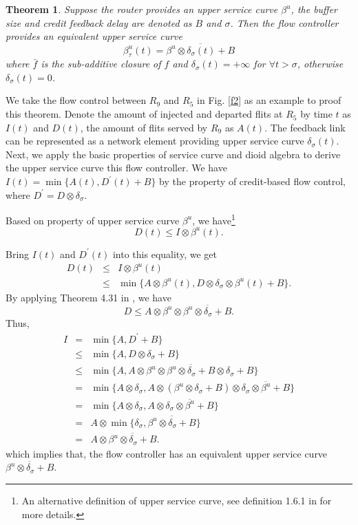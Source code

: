 \documentclass[10pt,journal]{IEEEtran}
\newtheorem{theorem}{Theorem}
\begin{document}
\begin{theorem}\label{credit}
Suppose the router provides an upper service curve $\beta^u$, the buffer size and credit feedback delay are denoted as $B$ and $\sigma$. Then the flow controller provides an equivalent upper service curve $$\beta^{u}_\tau(t)=\overline{\beta^u\otimes\delta_\sigma(t)+B}$$ where $\bar{f}$ is the sub-additive closure of $f$ \cite{Boudec2001Network} and $\delta_\sigma(t)=+\infty$ for $\forall t>\sigma$, otherwise $\delta_\sigma(t)=0$.
\end{theorem}
\begin{IEEEproof}
We take the flow control between $R_9$ and $R_5$ in Fig. \ref{f2} as an example to proof this theorem. Denote the amount of injected and departed flits at $R_5$ by time $t$ as $I(t)$ and $D(t)$, the amount of flits served by $R_9$ as $A(t)$. The feedback link can be represented as a network element providing upper service curve $\delta_\sigma(t)$. Next, we apply the basic properties of service curve and dioid algebra to derive the upper service curve this flow controller. We have $I(t)=\min\{A(t),D^\prime(t)+B\}$ by the property of credit-based flow control, where $D^\prime=D\otimes\delta_\sigma$.

Based on property of upper service curve $\beta^u$, we have\footnote{An alternative definition of upper service curve, see definition 1.6.1 in \cite{Boudec2001Network} for more details.}
$$D(t)\leq I\otimes \beta^u(t).$$

Bring $I(t)$ and $D^\prime(t)$ into this equality, we get
\begin{eqnarray*}
D(t)&\leq& I\otimes \beta^u(t)\\
&\leq& \min\{A\otimes \beta^u(t),D\otimes\delta_\sigma\otimes \beta^u(t)+B\}.
\end{eqnarray*}
By applying Theorem 4.31 in \cite{Boudec2001Network}, we have
$$D\leq A\otimes \beta^u\otimes\overline{\beta^u\otimes\delta_\sigma+B}.$$
Thus,
\begin{eqnarray*}
  I&=& \min\{A,D^\prime+B\}\\
  &\leq& \min\{A,D\otimes\delta_\sigma+B\}\\
  &\leq& \min\{A,A\otimes \beta^u\otimes\overline{\beta^u\otimes\delta_\sigma+B}\otimes\delta_\sigma+B\}\\
  &=& \min\{A\otimes \delta_\sigma,A\otimes (\beta^u\otimes\delta_\sigma+B)\otimes\overline{\delta_\sigma\otimes\beta^u+B}\}\\
  &=& \min\{A\otimes \delta_\sigma,A\otimes \overline{\delta_\sigma\otimes\beta^u+B}\}\\
  &=& A\otimes\min\{\delta_\sigma,\overline{\beta^u\otimes\delta_\sigma+B}\}\\
  &=& A\otimes\overline{\beta^u\otimes\delta_\sigma+B}.
\end{eqnarray*}
which implies that, the flow controller has an equivalent upper service curve $\overline{\beta^u\otimes\delta_\sigma+B}$.
\end{IEEEproof}
\end{document}
